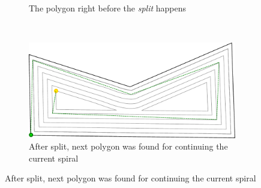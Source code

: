 \begin{figure}[htbp]
\begin{subfigure}[b]{0.45\textwidth}
    		\caption{The polygon right before the \textit{split} happens}
    \end{subfigure}~
    \begin{subfigure}[b]{0.45\textwidth}
    		\includegraphics[width=\textwidth]{images/algorithms/spiral_fill/done.pdf}
    		\caption{After split, next polygon was found for continuing the current spiral}


\end{subfigure}
\end{figure}
